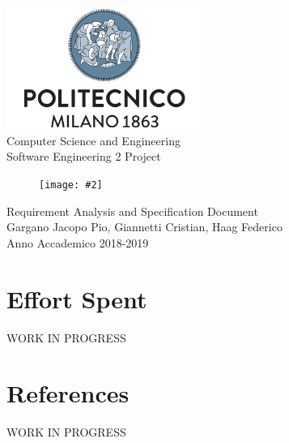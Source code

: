 \documentclass{report}
\newcommand{\image}[4]{
	\begin{figure}[H]
	\centering
	\texttt{[image: \#2]}
	\caption*{#3}
	\label{#4}

	\label{fig:nonfloat} %
	\end{figure}
}
\begin{document}
	\begin{titlepage}
		\centering	
		\vfill
		{
			\includegraphics[width =\linewidth, height = 4cm, keepaspectratio]{PolitecnicoLogo.png}
			\label{fig:PolitecnicoLogo}
			\large \\[2ex]Computer Science and Engineering\\
			\large Software Engineering 2 Project\\[10ex]			
			\image{5cm}{TrackMeLogo.png}{}{TrackMeLogo}
			\huge Requirement Analysis and Specification Document\\[2ex]
			\normalsize Gargano Jacopo Pio, Giannetti Cristian, Haag Federico\\[1ex]
			\normalsize Anno Accademico 2018-2019	 
		}
		
	\end{titlepage}

	
	\newpage
	\tableofcontents
	\let\tableofcontents\relax
	
	\newpage
	
	
	
	
	
		
	\chapter{Effort Spent}
	WORK IN PROGRESS
	\chapter{References}
	WORK IN PROGRESS
	
\end{document}
